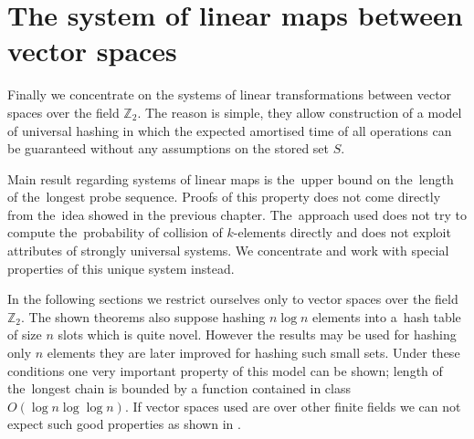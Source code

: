 \chapter{The system of linear maps between vector spaces}
Finally we concentrate on the systems of linear transformations between vector spaces over the field $\mathbb{Z}_2$. The reason is simple, they allow construction of a model of universal hashing in which the expected amortised time of all operations can be guaranteed without any assumptions on the stored set $S$. 

Main result regarding systems of linear maps is the~upper bound on the~length of the~longest probe sequence. Proofs of this property does not come directly from the~idea showed in the previous chapter. The~approach used does not try to compute the~probability of collision of $k$-elements directly and does not exploit attributes of strongly universal systems. We concentrate and work with special properties of this unique system instead.

In the following sections we restrict ourselves only to vector spaces over the field $\mathbb{Z}_2$. The shown theorems also suppose hashing $n \log n$ elements into a~hash table of size $n$ slots which is quite novel. However the results may be used for hashing only $n$ elements they are later improved for hashing such small sets. Under these conditions one very important property of this model can be shown; length of the~longest chain is bounded by a function contained in class $O(\log n \log \log n)$. If vector spaces used are over other finite fields we can not expect such good properties as shown in \cite{DBLP:journals/jacm/AlonDMPT99}.




